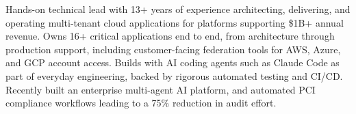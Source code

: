 \par{
    Hands-on technical lead with 13+ years of experience architecting,
    delivering, and operating multi-tenant cloud applications for platforms
    supporting \$1B+ annual revenue. Owns 16+ critical applications end to end,
    from architecture through production support, including customer-facing
    federation tools for AWS, Azure, and GCP account access. Builds with AI
    coding agents such as Claude Code as part of everyday engineering, backed by
    rigorous automated testing and CI/CD. Recently built an enterprise
    multi-agent AI platform, and automated PCI compliance workflows leading to a
    75\% reduction in audit effort.
}
